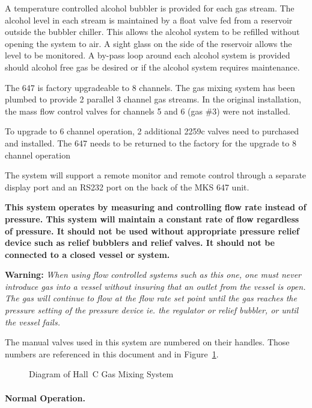 A temperature controlled alcohol bubbler is provided for each gas
stream.  The alcohol level in each stream is maintained by a float valve
fed from a reservoir outside the bubbler chiller. This allows the alcohol
system to be refilled without opening the system to air.  A sight glass on
the side of the reservoir allows the level to be monitored.  A by-pass loop
around each alcohol system is provided should alcohol free gas be desired
or if the alcohol system requires maintenance.

The 647 is factory upgradeable to 8 channels.  The gas mixing
system has been plumbed to provide 2 parallel 3 channel gas streams.  In
the original installation, the mass flow control valves for channels 5 and
6 (gas \#3) were not installed.

To upgrade to 6 channel operation, 2 additional 2259c valves need
to purchased and installed.  The 647 needs to be returned to the factory
for the upgrade to 8 channel operation

The system will support a remote monitor and remote control through
a separate display port and an RS232 port on the back of the MKS 647 unit.

{\bf This system operates by measuring and controlling flow rate instead
of pressure. This system will maintain a constant rate of flow
regardless of pressure. It should not be used without appropriate pressure
relief device such as relief bubblers and relief valves. It should not be
connected to a closed vessel or system.}

{\bf Warning:} {\em{When using flow controlled systems such as this one, one 
must never introduce gas into a vessel without insuring that an outlet from the vessel is 
open.  The gas will continue to flow at the flow rate set point until the gas 
reaches the pressure setting of the pressure device ie. the regulator or relief 
bubbler, or until the vessel fails}.}

The manual valves used in this system are numbered on their
handles.  Those numbers are referenced in this document and in
Figure~\ref{fig:gas_mix}.
\begin{figure}
\caption{Diagram of Hall~C Gas Mixing System\label{fig:gas_mix}}
\end{figure}

\paragraph{Normal Operation.}

